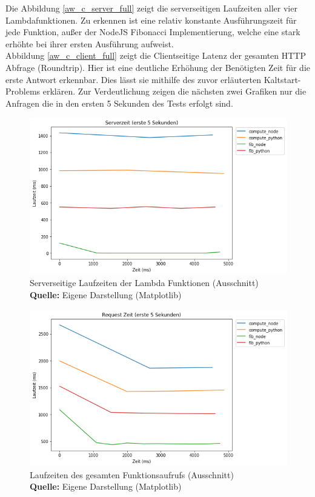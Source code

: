 \documentclass[12pt,a4paper,parskip=half]{scrreprt}
\newcommand*{\captionsource}[2]{%
	\caption[{#1}]{%
		#1%
		\\\hspace{\linewidth}%
		\textbf{Quelle:} #2%
	}%
}
\begin{document}
Die Abbildung \ref{aw_c_server_full} zeigt die serverseitigen Laufzeiten aller vier Lambdafunktionen. Zu erkennen ist eine relativ konstante Ausführungszeit für jede Funktion, außer der NodeJS Fibonacci Implementierung, welche eine stark erhöhte bei ihrer ersten Ausführung aufweist.
\\

Abbildung \ref{aw_c_client_full} zeigt die Clientseitige Latenz der gesamten HTTP Abfrage (Roundtrip). Hier ist eine deutliche Erhöhung der Benötigten Zeit für die erste Antwort erkennbar. Dies lässt sie mithilfe des zuvor erläuterten Kaltstart-Problems erklären. Zur Verdeutlichung zeigen die nächsten zwei Grafiken nur die Anfragen die in den ersten 5 Sekunden des Tests erfolgt sind.

\FloatBarrier
\begin{figure}[h!]
	\centering
	\includegraphics[scale=0.7]{aw_c_server_start}
	\captionsource{Serverseitige Laufzeiten der Lambda Funktionen (Ausschnitt)}
	{Eigene Darstellung (Matplotlib)}
	\label{aw_c_server_start}
\end{figure}
\FloatBarrier

\FloatBarrier
\begin{figure}[h!]
	\centering
	\includegraphics[scale=0.7]{aw_c_client_start}
	\captionsource{Laufzeiten des gesamten Funktionsaufrufs (Ausschnitt)}
	{Eigene Darstellung (Matplotlib)}
	\label{aw_c_client_start}
\end{figure}
\FloatBarrier
\end{document}
